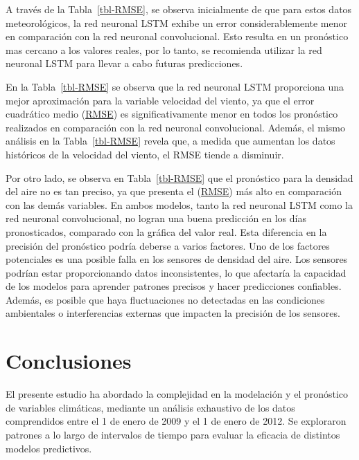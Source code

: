 \documentclass[
  us-letterpaper,
]{scrreprt}
\theoremstyle{plain}
\theoremstyle{definition}
\theoremstyle{definition}
\theoremstyle{remark}
\begin{document}
A través de la Tabla~\ref{tbl-RMSE}, se observa inicialmente de que para
estos datos meteorológicos, la red neuronal LSTM exhibe un error
considerablemente menor en comparación con la red neuronal
convolucional. Esto resulta en un pronóstico mas cercano a los valores
reales, por lo tanto, se recomienda utilizar la red neuronal LSTM para
llevar a cabo futuras predicciones.

En la Tabla~\ref{tbl-RMSE} se observa que la red neuronal LSTM
proporciona una mejor aproximación para la variable velocidad del
viento, ya que el error cuadrático medio (\hyperref[sec-RMSE]{RMSE}) es
significativamente menor en todos los pronóstico realizados en
comparación con la red neuronal convolucional. Además, el mismo análisis
en la Tabla~\ref{tbl-RMSE} revela que, a medida que aumentan los datos
históricos de la velocidad del viento, el RMSE tiende a disminuir.

Por otro lado, se observa en Tabla~\ref{tbl-RMSE} que el pronóstico para
la densidad del aire no es tan preciso, ya que presenta el
(\hyperref[sec-RMSE]{RMSE}) más alto en comparación con las demás
variables. En ambos modelos, tanto la red neuronal LSTM como la red
neuronal convolucional, no logran una buena predicción en los días
pronosticados, comparado con la gráfica del valor real. Esta diferencia
en la precisión del pronóstico podría deberse a varios factores. Uno de
los factores potenciales es una posible falla en los sensores de
densidad del aire. Los sensores podrían estar proporcionando datos
inconsistentes, lo que afectaría la capacidad de los modelos para
aprender patrones precisos y hacer predicciones confiables. Además, es
posible que haya fluctuaciones no detectadas en las condiciones
ambientales o interferencias externas que impacten la precisión de los
sensores.


\chapter*{Conclusiones}\label{conclusiones}


El presente estudio ha abordado la complejidad en la modelación y el
pronóstico de variables climáticas, mediante un análisis exhaustivo de
los datos comprendidos entre el 1 de enero de 2009 y el 1 de enero de
2012. Se exploraron patrones a lo largo de intervalos de tiempo para
evaluar la eficacia de distintos modelos predictivos.
\end{document}
